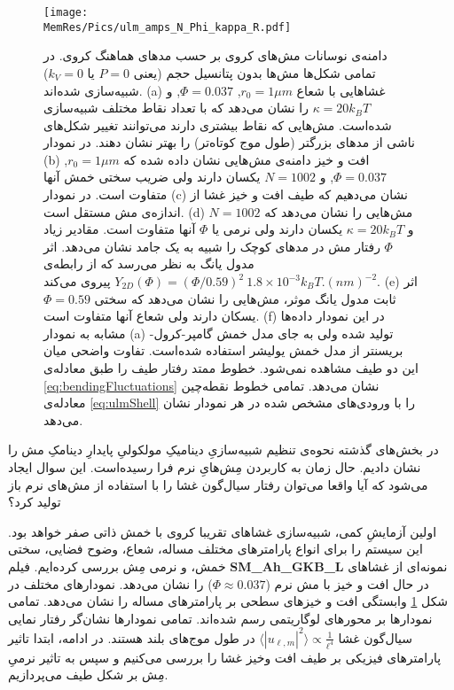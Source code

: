 \begin{figure}[htbp]
\begin{center}
\texttt{[image: \\MemRes/Pics/ulm\_amps\_N\_Phi\_kappa\_R.pdf]}
\caption{
دامنه‌ی نوسانات مش‌های کروی بر حسب مد‌های هماهنگ کروی. در تمامی شکل‌ها مش‌ها بدون پتانسیل‌ حجم (یعنی
$P=0$
یا
$k_V=0$)
 شبیه‌سازی شده‌اند. 
(a)
غشا‌هایی با شعاع
 $r_0=1\mu m$,  $\Phi=0.037$, 
 و
$\kappa=20k_BT$
را نشان می‌دهد که با تعداد نقاط مختلف شبیه‌سازی شده‌است.  مش‌هایی که نقاط بیشتری‌ دارند می‌توانند تغییر شکل‌های ناشی از مد‌های بزرگتر (طول موج کوتاه‌تر) را بهتر نشان دهند. در نمودار
(b)
افت و خیز دامنه‌‌ی مش‌هایی نشان داده شده که 
$r_0=1\mu m$, $\Phi=0.037$,
 و
$N=1002$
یکسان دارند ولی ضریب سختی خمش آنها متفاوت است. در نمودار
(c)
نشان می‌دهیم که طیف افت و خیز غشا از اندازه‌ی مش مستقل است. 
(d)
مش‌هایی را نشان می‌دهد که 
$N=1002$
و
$\kappa=20k_BT$
یکسان دارند ولی نرمی یا 
$\Phi$
آنها متفاوت است. مقادیر زیاد 
 $\Phi$ 
رفتار مش‌ در مدهای کوچک را شبیه به یک جامد نشان می‌دهد. اثر مدول یانگ به نظر می‌رسد که از رابطه‌ی
$Y_{2D}(\Phi)=(\Phi/0.59)^2~1.8\times10^{-3}k_BT.(nm)^{-2}$
پیروی می‌کند. 
(e)
اثر ثابت مدول یانگ موثر، مش‌هایی را نشان می‌دهد که سختی
$\Phi=0.59$
یسکان دارند ولی شعاع آنها متفاوت است. 
(f)
در این نمودار داده‌ها مشابه به نمودار 
(a)
تولید شده ولی به جای مدل خمش گامپر-کرول-بریسنتر از مدل خمش یولیشر استفاده شده‌است. تفاوت واضحی میان این دو طیف مشاهده نمی‌شود. خطوط ممتد رفتار طیف را طبق معادله‌ی
\ref{eq:bendingFluctuations}
نشان می‌دهد. تمامی خطوط نقطه‌چین معادله‌ی 
\ref{eq:ulmShell}
را با ورودی‌های مشخص شده در هر نمودار نشان می‌‌دهد.
}
\label{fig:kappaULMS}
\end{center}
\end{figure}

در بخش‌های گذشته نحوه‌ی تنظیم  شبیه‌سازیِ دینامیکِ مولکولیِ پایدارِ دینامکِ مش را نشان دادیم. حال زمان به کاربردن مِش‌هایِ نرم فرا رسیده‌است. این سوال ایجاد می‌شود که آیا واقعا می‌توان رفتار سیال‌گون غشا را با استفاده از مش‌های نرم باز تولید کرد؟

اولین آزمایشِ کمی، شبیه‌سازی غشا‌های تقریبا کروی با خمش ذاتی صفر خواهد بود. این سیستم را برای انواع پارامترهای مختلف مساله، شعاع، وضوح فضایی، سختی خمش، و نرمی مِش بررسی کرده‌ایم. فیلم
{\bf SM\_Ah\_GKB\_L}
نمونه‌ای از غشاهای در حال افت و خیز با مش‌ نرم 
($\Phi\approx0.037$)
را نشان می‌دهد. نمودارهای مختلف در شکل
\ref{fig:kappaULMS}
وابستگی افت و خیز‌های سطحی بر پارامتر‌های مساله را نشان می‌دهد. تمامی نمودار‌ها بر محور‌های لوگاریتمی رسم شده‌اند. تمامی نمودار‌ها  نشان‌گر  رفتار نمایی سیال‌گون غشا
$\langle|u_{\ell,m}|^2\rangle\propto \frac{1}{\ell^4}$
 در طول‌ موج‌های بلند هستند. در ادامه، ابتدا تاثیر پارامتر‌های فیزیکی بر طیف افت وخیز غشا را بررسی می‌کنیم و سپس به تاثیر نرمیِ مِش بر شکل طیف می‌پردازیم.

